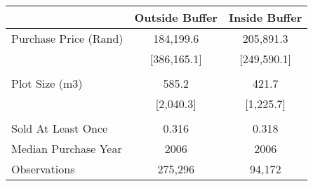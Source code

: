 \begin{tabu}{lcc}
\toprule
 & Outside Buffer & Inside Buffer  \\
\midrule
 Purchase Price (Rand)  & 184,199.6  & 205,891.3  \\ 
\rowfont{\footnotesize} & [386,165.1]  & [249,590.1]  \\ 
 &  &  \\ 
 Plot Size (m3)  & 585.2  & 421.7  \\ 
\rowfont{\footnotesize} & [2,040.3]  & [1,225.7]  \\ 
 &  &  \\ 
 Sold At Least Once  & 0.316  & 0.318  \\ 
 Median Purchase Year  & 2006  & 2006  \\ 
\midrule
 Observations  & 275,296  & 94,172  \\ 
\bottomrule
\end{tabu}
